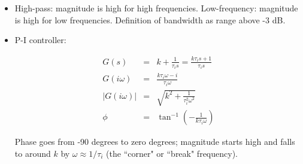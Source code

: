 \documentclass{article}
\begin{document}
\begin{itemize}
\begin{figure}
\centering
{}
\label{fig:eachcomponentalone}
\end{figure}

\item High-pass: magnitude is high for high frequencies. Low-frequency: magnitude is high for low frequencies. Definition of bandwidth as range above -3 dB.

\item P-I controller:

\begin{eqnarray*}
G(s) & = & k +  \frac{1}{\tau_i s} = \frac{k\tau_i s + 1}{\tau_i s}\\ 
G(i\omega) & = &  \frac{k\tau_i \omega - i}{\tau_i \omega}\\
\left| G(i\omega) \right| & = & \sqrt{k^2 + \frac{1}{\tau_i^2 \omega^2} }\\
\phi &= &  \tan^{-1} \left( - \frac{1}{k \tau_i \omega} \right)
\end{eqnarray*}

Phase goes from -90 degrees to zero degrees; magnitude starts high and falls to around $k$ by $\omega \approx 1/\tau_i$ (the ``corner" or ``break" frequency).


\end{itemize}
\end{document}
